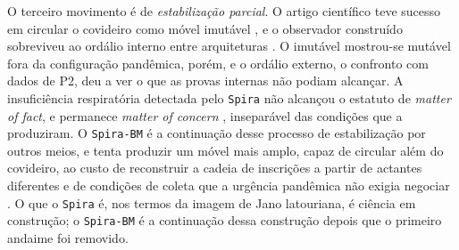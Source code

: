 O terceiro movimento é de \textit{estabilização parcial}. O artigo científico teve sucesso em circular o covideiro como móvel imutável \parencite{Latour2011CienciaEmAcao}, e o observador construído sobreviveu ao ordálio interno entre arquiteturas \parencite{Latour1986Writing}. O imutável mostrou-se mutável fora da configuração pandêmica, porém, e o ordálio externo, o confronto com dados de P2, deu a ver o que as provas internas não podiam alcançar. A insuficiência respiratória detectada pelo \texttt{Spira} não alcançou o estatuto de \textit{matter of fact}, e permanece \textit{matter of concern} \parencite{latour2004politics}, inseparável das condições que a produziram. O \texttt{Spira-BM} é a continuação desse processo de estabilização por outros meios, e tenta produzir um móvel mais amplo, capaz de circular além do covideiro, ao custo de reconstruir a cadeia de inscrições a partir de actantes diferentes e de condições de coleta que a urgência pandêmica não exigia negociar \parencite{Finger2025SPIRABM}. O que o \texttt{Spira} é, nos termos da imagem de Jano latouriana, é ciência em construção; o \texttt{Spira-BM} é a continuação dessa construção depois que o primeiro andaime foi removido.


